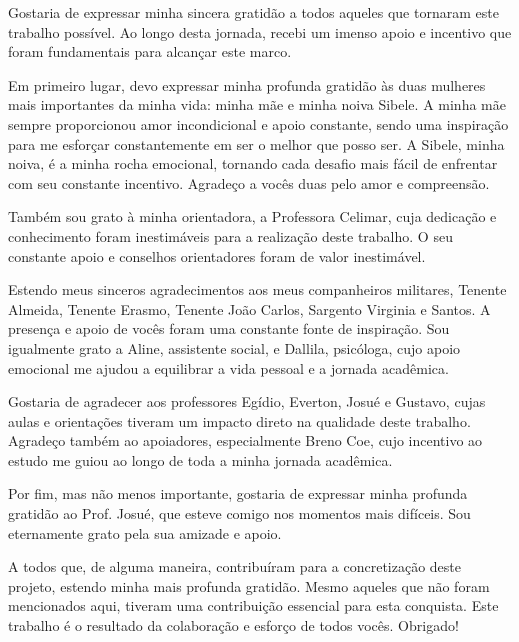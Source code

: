 Gostaria de expressar minha sincera gratidão a todos aqueles que tornaram este
trabalho possível. Ao longo desta jornada, recebi um imenso apoio e incentivo
que foram fundamentais para alcançar este marco.

Em primeiro lugar, devo expressar minha profunda gratidão às duas mulheres mais
importantes da minha vida: minha mãe e minha noiva Sibele. A minha mãe sempre
proporcionou amor incondicional e apoio constante, sendo uma inspiração para me
esforçar constantemente em ser o melhor que posso ser. A Sibele, minha noiva, é
a minha rocha emocional, tornando cada desafio mais fácil de enfrentar com seu
constante incentivo. Agradeço a vocês duas pelo amor e compreensão.

Também sou grato à minha orientadora, a Professora Celimar, cuja dedicação e
conhecimento foram inestimáveis para a realização deste trabalho. O seu
constante apoio e conselhos orientadores foram de valor inestimável.

Estendo meus sinceros agradecimentos aos meus companheiros militares, Tenente
Almeida, Tenente Erasmo, Tenente João Carlos, Sargento Virginia e Santos. A
presença e apoio de vocês foram uma constante fonte de inspiração. Sou
igualmente grato a Aline, assistente social, e Dallila, psicóloga, cujo apoio
emocional me ajudou a equilibrar a vida pessoal e a jornada acadêmica.

Gostaria de agradecer aos professores Egídio, Everton, Josué e Gustavo, cujas
aulas e orientações tiveram um impacto direto na qualidade deste trabalho.
Agradeço também ao apoiadores, especialmente Breno Coe, cujo incentivo ao
estudo me guiou ao longo de toda a minha jornada acadêmica.

Por fim, mas não menos importante, gostaria de expressar minha profunda
gratidão ao Prof. Josué, que esteve comigo nos momentos mais difíceis. Sou
eternamente grato pela sua amizade e apoio.

A todos que, de alguma maneira, contribuíram para a concretização deste
projeto, estendo minha mais profunda gratidão. Mesmo aqueles que não foram
mencionados aqui, tiveram uma contribuição essencial para esta conquista. Este
trabalho é o resultado da colaboração e esforço de todos vocês. Obrigado!